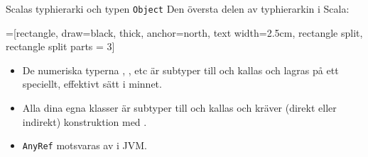 \begin{Slide}{Scalas typhierarki och typen \texttt{Object}}
Den översta delen av typhierarkin i Scala: 
\vspace{1em}
\begin{center}
\newcommand{\TextBox}[1]{\raisebox{0pt}[1em][0.5em]{#1}}
=[rectangle, draw=black,  thick, anchor=north, text width=2.5cm, rectangle split, rectangle split parts = 3]
\end{center}
\begin{itemize}\SlideFontSmall
\item De numeriska typerna , , etc är subtyper till  och kallas  och lagras på ett speciellt, effektivt sätt i minnet.  
\item Alla dina egna klasser är subtyper till  och kallas  och kräver (direkt eller indirekt) konstruktion med .
\item \texttt{AnyRef} motsvaras av  i JVM.
\end{itemize}
\end{Slide}



